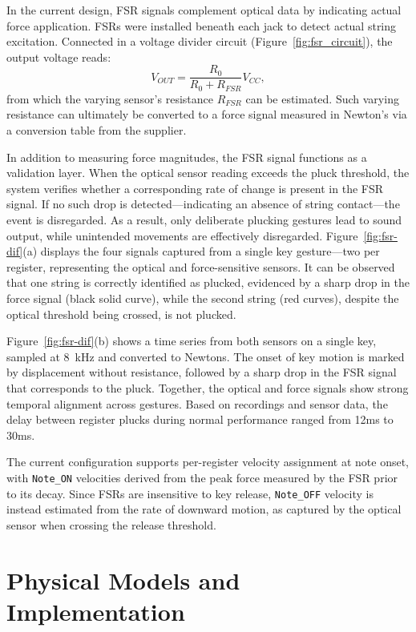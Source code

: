 In the current design, FSR signals complement optical data by indicating actual force application. FSRs were installed beneath each jack to detect actual string excitation. Connected in a voltage divider circuit (Figure~\ref{fig:fsr_circuit}), the output voltage reads:
\begin{equation}\label{eq:fsr_circuit}
V_{OUT} = \frac{R_0}{R_0 + R_{FSR}}V_{CC},
\end{equation}
from which the varying sensor's resistance $R_{FSR}$ can be estimated. Such varying resistance can ultimately be converted to a force signal measured in Newton's via a conversion table from the supplier. 

In addition to measuring force magnitudes, the FSR signal functions as a validation layer. When the optical sensor reading exceeds the pluck threshold, the system verifies whether a corresponding rate of change is present in the FSR signal. If no such drop is detected—indicating an absence of string contact—the event is disregarded. As a result, only deliberate plucking gestures lead to sound output, while unintended movements are effectively disregarded. Figure~\ref{fig:fsr-dif}(a) displays the four signals captured from a single key gesture—two per register, representing the optical and force-sensitive sensors. It can be observed that one string is correctly identified as plucked, evidenced by a sharp drop in the force signal (black solid curve), while the second string (red curves), despite the optical threshold being crossed, is not plucked.

Figure~\ref{fig:fsr-dif}(b) shows a time series from both sensors on a single key, sampled at 8~kHz and converted to Newtons. The onset of key motion is marked by displacement without resistance, followed by a sharp drop in the FSR signal that corresponds to the pluck. Together, the optical and force signals show strong temporal alignment across gestures. Based on recordings and sensor data, the delay between register plucks during normal performance ranged from 12ms to 30ms. 


The current configuration supports per-register velocity assignment at note onset, with \texttt{Note\_ON} velocities derived from the peak force measured by the FSR prior to its decay. Since FSRs are insensitive to key release, \texttt{Note\_OFF} velocity is instead estimated from the rate of downward motion, as captured by the optical sensor when crossing the release threshold.



\section{Physical Models and Implementation}

